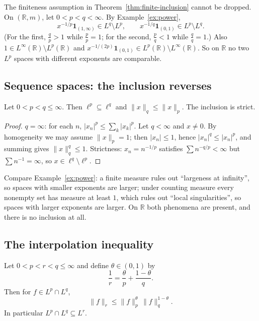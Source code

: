 \documentclass[11pt]{article}
\newcommand{\R}{\mathbb{R}}
\newcommand{\norm}[1]{\lVert #1\rVert}
\newcommand{\ind}{\mathbf{1}}
\begin{document}
\begin{example}\label{ex:no-inclusion}
The finiteness assumption in Theorem~\ref{thm:finite-inclusion} cannot be dropped. On $(\R,m)$, let $0<p<q<\infty$. By Example~\ref{ex:power},
\[
x^{-1/p}\ind_{(1,\infty)}\in L^{q}\setminus L^{p},\qquad x^{-1/q}\ind_{(0,1)}\in L^{p}\setminus L^{q}.
\]
(For the first, $\frac{q}{p}>1$ while $\frac pp=1$; for the second, $\frac pq<1$ while $\frac qq=1$.) Also $1\in L^{\infty}(\R)\setminus L^{p}(\R)$ and $x^{-1/(2p)}\ind_{(0,1)}\in L^{p}(\R)\setminus L^{\infty}(\R)$. So on $\R$ no two $L^{p}$ spaces with different exponents are comparable.
\end{example}

\subsection{Sequence spaces: the inclusion reverses}

\begin{theorem}\label{thm:lp-inclusion}
Let $0<p<q\le\infty$. Then $\ell^{p}\subseteq\ell^{q}$ and $\norm{x}_{q}\le\norm{x}_{p}$. The inclusion is strict.
\end{theorem}

\begin{proof}
$q=\infty$: for each $n$, $|x_{n}|^{p}\le\sum_{k}|x_{k}|^{p}$. Let $q<\infty$ and $x\ne0$. By homogeneity we may assume $\norm{x}_{p}=1$; then $|x_{n}|\le1$, hence $|x_{n}|^{q}\le|x_{n}|^{p}$, and summing gives $\norm{x}_{q}^{q}\le1$. Strictness: $x_{n}=n^{-1/p}$ satisfies $\sum n^{-q/p}<\infty$ but $\sum n^{-1}=\infty$, so $x\in\ell^{q}\setminus\ell^{p}$.
\end{proof}

Compare Example~\ref{ex:power}: a finite measure rules out ``largeness at infinity'', so spaces with smaller exponents are larger; under counting measure every nonempty set has measure at least $1$, which rules out ``local singularities'', so spaces with larger exponents are larger. On $\R$ both phenomena are present, and there is no inclusion at all.

\subsection{The interpolation inequality}

\begin{theorem}\label{thm:interpolation}
Let $0<p<r<q\le\infty$ and define $\theta\in(0,1)$ by
\[
\frac1r=\frac{\theta}{p}+\frac{1-\theta}{q}.
\]
Then for $f\in L^{p}\cap L^{q}$,
\[
\norm{f}_{r}\le\norm{f}_{p}^{\theta}\,\norm{f}_{q}^{1-\theta}.
\]
In particular $L^{p}\cap L^{q}\subseteq L^{r}$.
\end{theorem}
\end{document}
